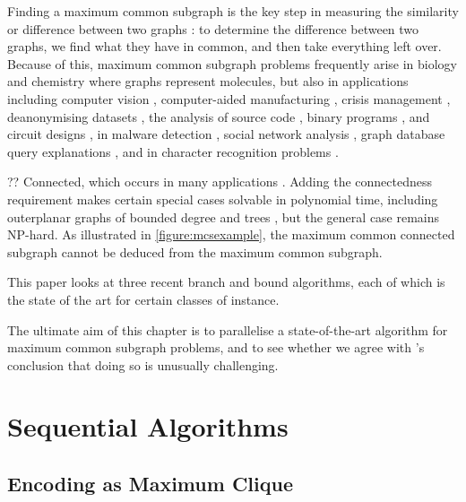 \documentclass[sigconf]{acmart}
\newcommand{\citepos}[1]{\citet{#1}'s}
\begin{document}
Finding a maximum common subgraph is the key step in measuring the similarity or difference between
two graphs \citep{DBLP:journals/prl/Bunke97,DBLP:journals/prl/FernandezV01,o:Kriege15}: to determine
the difference between two graphs, we find what they have in common, and then take everything left
over. Because of this, maximum common subgraph problems frequently arise in biology and chemistry
\citep{DBLP:journals/jcamd/RaymondW02a,o:EhrlichR11,DBLP:journals/dam/GayFMSS14} where graphs
represent molecules, but also in applications including computer vision
\citep{DBLP:journals/jair/CookH94,DBLP:conf/gbrpr/CombierDS13}, computer-aided manufacturing
\citep{o:LuoWSN17}, crisis management \citep{o:DelavalladeFLL16}, deanonymising datasets
\citep{o:SharadD13}, the analysis of source code \citep{DBLP:journals/tkde/DjokoCH97}, binary
programs \citep{DBLP:conf/icics/GaoRS08}, and circuit designs \citep{DBLP:journals/jair/CookH94}, in
malware detection \citep{DBLP:journals/compsec/ParkRS13}, social network analysis
\citep{DBLP:journals/tkde/FangYZZ15}, graph database query explanations
\citep{DBLP:journals/jcss/VasilyevaTBL16}, and in character recognition problems
\citep{DBLP:journals/pr/LuRS91}.

?? Connected, which occurs in many applications
\citep{DBLP:journals/tcs/Koch01,DBLP:journals/jcamd/RaymondW02a,DBLP:conf/mco/VismaraV08,o:EhrlichR11,o:LuoWSN17}.
Adding the connectedness requirement makes certain special cases solvable in polynomial time,
including outerplanar graphs of bounded degree \citep{DBLP:journals/algorithms/AkutsuT13} and trees
\citep{DBLP:conf/mfcs/DroschinskyKM16}, but the general case remains NP-hard. As illustrated in
\cref{figure:mcsexample}, the maximum common connected subgraph cannot be deduced from the maximum
common subgraph.

This paper looks at three recent branch and bound algorithms, each of which is the state of the art
for certain classes of instance.

The ultimate aim of this chapter is to parallelise a state-of-the-art algorithm for maximum common
subgraph problems, and to see whether we agree with \citepos{DBLP:conf/ictai/MinotNS15} conclusion
that doing so is unusually challenging.

\section{Sequential Algorithms}

\subsection{Encoding as Maximum Clique}
\end{document}
